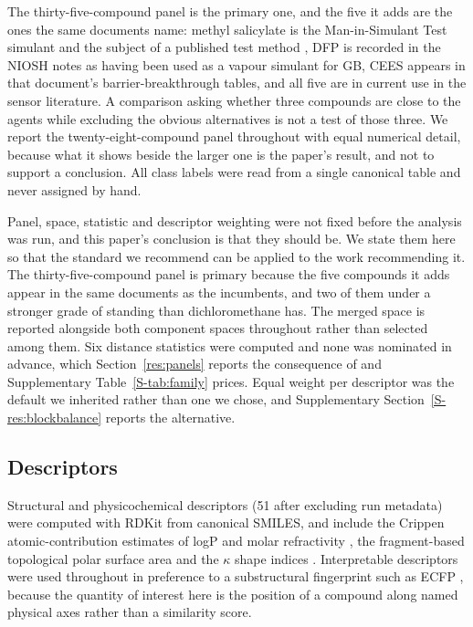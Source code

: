 \documentclass[1p,times]{elsarticle}
\begin{document}
The thirty-five-compound panel is the primary one, and the five it adds are the
ones the same documents name: methyl salicylate is the Man-in-Simulant Test
simulant and the subject of a published test method \cite{nrc1997mist,
astmf2588}, DFP is recorded in the NIOSH notes as having been used as a vapour
simulant for GB, CEES appears in that document's barrier-breakthrough tables,
and all five are in current use in the sensor literature. A comparison asking
whether three compounds are close to the agents while excluding the obvious
alternatives is not a test of those three. We report the twenty-eight-compound
panel throughout with equal numerical detail, because what it shows beside the
larger one is the paper's result, and not to support a conclusion. All class
labels were read from a single canonical table and never assigned by hand.

Panel, space, statistic and descriptor weighting were not fixed before the
analysis was run, and this paper's conclusion is that they should be. We state
them here so that the standard we recommend can be applied to the work
recommending it. The thirty-five-compound panel is primary because the five
compounds it adds appear in the same documents as the incumbents, and two of
them under a stronger grade of standing than dichloromethane has. The
merged space is reported alongside both component spaces throughout rather than
selected among them. Six distance statistics were computed and none was
nominated in advance, which Section~\ref{res:panels} reports the consequence of
and Supplementary Table~\ref{S-tab:family} prices. Equal weight per descriptor was the default
we inherited rather than one we chose, and Supplementary
Section~\ref{S-res:blockbalance} reports the alternative.

\subsection{Descriptors}
\label{meth:descriptors}
Structural and physicochemical descriptors (51 after excluding run metadata)
were computed with RDKit \cite{rdkit} from canonical SMILES, and include the
Crippen atomic-contribution estimates of logP and molar refractivity
\cite{wildman1999}, the fragment-based topological polar surface area
\cite{ertl2000} and the $\kappa$ shape indices \cite{kier1985}. Interpretable
descriptors were used throughout in preference to a substructural fingerprint
such as ECFP \cite{rogers2010}, because the quantity of interest here is the
position of a compound along named physical axes rather than a similarity score.
\end{document}
